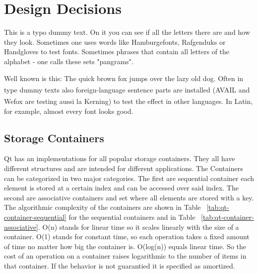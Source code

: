 \section{Design Decisions}
\label{sec:typeareatest_typedummytext}

This is a typo dummy text. On it you can see if all the letters there are and how they look. Sometimes one uses words like Hamburgefonts, Rafgenduks or Handgloves to test fonts. Sometimes phrases that contain all letters of the alphabet - one calls these sets "pangrams".

Well known is this: The quick brown fox jumps over the lazy old dog. Often in type dummy texts also foreign-language sentence parts are installed (AVAIL\textsuperscript{\texttrademark} and Wefox\textsuperscript{\textregistered} are testing aussi la Kerning) to test the effect in other languages. In Latin, for example, almost every font looks good.

\subsection{Storage Containers}
\label{subsec:satzspiegeltest_typoblindtext_demonstrandum}

Qt has an implementations for all popular storage containers. They all have different structures and are intended for different applications. The Containers can be categorized in two major categories. The first are sequential container each element is stored at a certain index and can be accessed over said index. The second are associative containers and set where all elements are stored with a key. The algorithmic complexity of the  containers are shown in Table ~\ref{tab:qt-container-sequential} for the sequential containers and in Table ~\ref{tab:qt-container-associative}. O(n) stands for linear time so it scales linearly with the size of a container. O(1) stands for constant time, so each operation takes a fixed amount of time no matter how big the container is. O(log(n)) equals linear time. So the cost of an operation on a container raises logarithmic to the number of items in that container. If the behavior is not guarantied it is specified as amortized.


